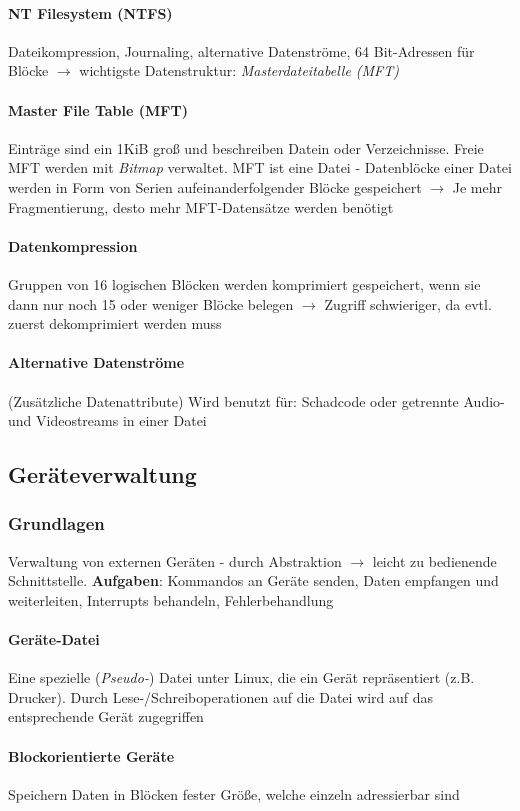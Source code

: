 \documentclass[11pt,a4paper,landscape]{article}
\begin{document}
\begin{multicols*}{3}
	\paragraph{NT Filesystem (NTFS)} Dateikompression, Journaling, alternative Datenströme, 64 Bit-Adressen für Blöcke $\rightarrow$ wichtigste Datenstruktur: \textit{Masterdateitabelle (MFT)} 
	\paragraph{Master File Table (MFT)} Einträge sind ein 1KiB groß und beschreiben Datein oder Verzeichnisse. Freie MFT werden mit \textit{Bitmap} verwaltet. MFT ist eine Datei - Datenblöcke einer Datei werden in Form von Serien aufeinanderfolgender Blöcke gespeichert $\rightarrow$ Je mehr Fragmentierung, desto mehr MFT-Datensätze werden benötigt
	\paragraph{Datenkompression} Gruppen von 16 logischen Blöcken werden komprimiert gespeichert, wenn sie dann nur noch 15 oder weniger Blöcke belegen $\rightarrow$ Zugriff schwieriger, da evtl. zuerst dekomprimiert werden muss
	\paragraph{Alternative Datenströme} (Zusätzliche Datenattribute) Wird benutzt für: Schadcode oder getrennte Audio- und Videostreams in einer Datei
	\subsection{Geräteverwaltung}
	\subsubsection{Grundlagen}
	Verwaltung von externen Geräten - durch Abstraktion $\rightarrow$ leicht zu bedienende Schnittstelle. \textbf{Aufgaben}: Kommandos an Geräte senden, Daten empfangen und weiterleiten, Interrupts behandeln, Fehlerbehandlung
	\paragraph{Geräte-Datei} Eine spezielle (\textit{Pseudo-}) Datei unter Linux, die ein Gerät repräsentiert (z.B. Drucker). Durch Lese-/Schreiboperationen auf die Datei wird auf das entsprechende Gerät zugegriffen
	\paragraph{Blockorientierte Geräte} Speichern Daten in Blöcken fester Größe, welche einzeln adressierbar sind

\end{multicols*}
\end{document}
